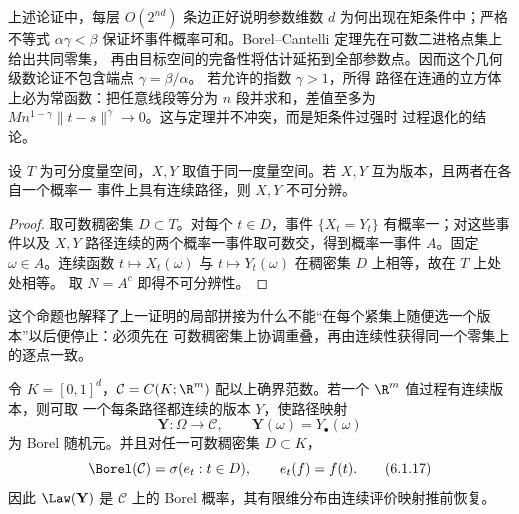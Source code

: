 上述论证中，每层 $O(2^{nd})$ 条边正好说明参数维数 $d$ 为何出现在矩条件中；严格不等式
$\alpha\gamma<\beta$ 保证坏事件概率可和。Borel--Cantelli 定理先在可数二进格点集上给出共同零集，
再由目标空间的完备性将估计延拓到全部参数点。因而这个几何级数论证不包含端点
$\gamma=\beta/\alpha$。
若允许的指数 $\gamma>1$，所得 \Holder{} 路径在连通的立方体上必为常函数：把任意线段等分为 $n$
段并求和，差值至多为 $Mn^{1-\gamma}\|t-s\|^\gamma\to0$。这与定理并不冲突，而是矩条件过强时
过程退化的结论。

\begin{proposition}[连续版本的唯一性]\label{proposition:6-1-3-3}
设 $T$ 为可分度量空间，$X,Y$ 取值于同一度量空间。若 $X,Y$ 互为版本，且两者在各自一个概率一
事件上具有连续路径，则
$X,Y$ 不可分辨。
\end{proposition}

\begin{proof}
取可数稠密集 $D\subset T$。对每个 $t\in D$，事件 $\{X_t=Y_t\}$ 有概率一；对这些事件以及
$X,Y$ 路径连续的两个概率一事件取可数交，得到概率一事件 $A$。固定 $\omega\in A$。连续函数
$t\mapsto X_t(\omega)$ 与 $t\mapsto Y_t(\omega)$ 在稠密集 $D$ 上相等，故在 $T$ 上处处相等。
取 $N=A^c$ 即得不可分辨性。
\end{proof}

这个命题也解释了上一证明的局部拼接为什么不能“在每个紧集上随便选一个版本”以后便停止：必须先在
可数稠密集上协调重叠，再由连续性获得同一个零集上的逐点一致。

\begin{proposition}[连续路径空间上的分布]\label{proposition:6-1-3-4}
令 $K=[0,1]^d$，$\mathcal C=C(K;\R^m)$ 配以上确界范数。若一个 $\R^m$ 值过程有连续版本，则可取
一个每条路径都连续的版本 $Y$，使路径映射
\[
  \mathbf Y:\Omega\longrightarrow\mathcal C,
  \qquad \mathbf Y(\omega)=Y_\bullet(\omega)
\]
为 Borel 随机元。并且对任一可数稠密集 $D\subset K$，
\[
  \Borel(\mathcal C)=\sigma(e_t:t\in D),
  \qquad e_t(f)=f(t).
  \tag{6.1.17}\label{eq:6-1-3-path-borel}
\]
因此 $\Law(\mathbf Y)$ 是 $\mathcal C$ 上的 Borel 概率，其有限维分布由连续评价映射推前恢复。
\end{proposition}

